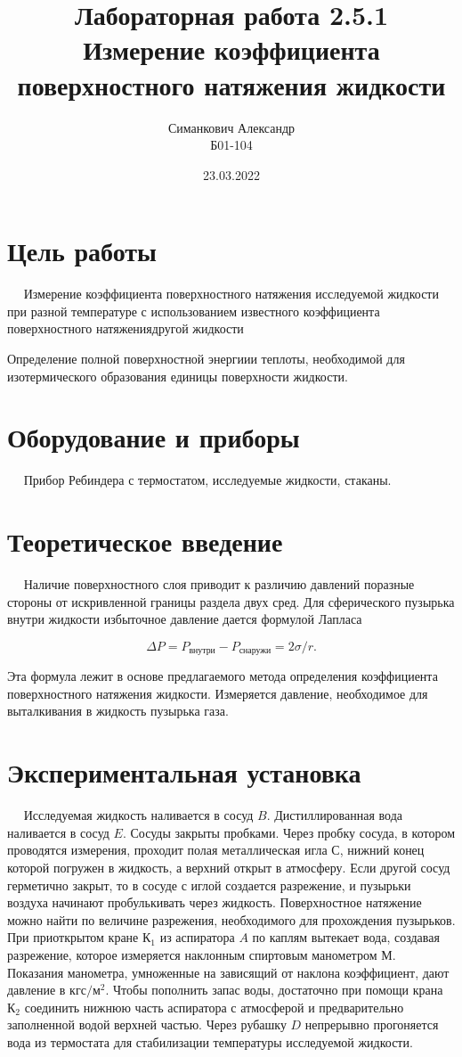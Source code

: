 \documentclass[12pt,a4paper]{article}
\title{Лабораторная работа 2.5.1\\ Измерение коэффициента поверхностного натяжения жидкости}
\author{Симанкович Александр \\ Б01-104}
\date{23.03.2022}
\begin{document}
	\maketitle
	
	\section*{Цель работы}
	
	$\quad$ Измерение коэффициента поверхностного натяжения исследуемой жидкости при разной температуре с использованием известного коэффициента поверхностного натяжениядругой жидкости
	
	Определение полной поверхностной энергиии теплоты, необходимой для изотермического образования единицы поверхности жидкости.
	
	\section*{Оборудование и приборы} 
	$\quad$ Прибор Ребиндера с термостатом, исследуемые жидкости, стаканы.
	
	\section*{Теоретическое введение}
	
	$\quad$ Наличие поверхностного слоя приводит к различию давлений поразные стороны от искривленной границы раздела двух сред. Для сферического пузырька внутри жидкости избыточное давление дается формулой Лапласа
	
	$$\Delta P = P_\text{внутри}-P_\text{снаружи}=2\sigma/r.$$
	
	Эта формула лежит в основе предлагаемого метода определения коэффициента поверхностного натяжения жидкости. Измеряется давление, необходимое для выталкивания в жидкость пузырька газа.
	
	\section*{Экспериментальная установка}
	
	$\quad$  Исследуемая жидкость наливается в сосуд $B$. Дистиллированная вода наливается в сосуд $E$. Сосуды закрыты пробками. Через пробку сосуда, в котором проводятся измерения, проходит полая металлическая игла $С$, нижний конец которой погружен в жидкость, а верхний открыт в атмосферу. Если другой сосуд герметично закрыт, то в сосуде с иглой создается разрежение, и пузырьки воздуха начинают пробулькивать через жидкость. Поверхностное натяжение можно найти по величине разрежения, необходимого для прохождения пузырьков. При приоткрытом кране $\text{К}_1$ из аспиратора $A$ по каплям вытекает вода, создавая разрежение, которое измеряется наклонным спиртовым манометром $М$. Показания манометра, умноженные на зависящий от наклона коэффициент, дают давление в $\text{кгс}/\text{м}^2$. Чтобы пополнить запас воды, достаточно при помощи крана $\text{К}_2$ соединить нижнюю часть аспиратора с атмосферой и предварительно заполненной водой верхней частью. Через рубашку $D$ непрерывно прогоняется вода из термостата для стабилизации температуры исследуемой жидкости.
	
\end{document}
